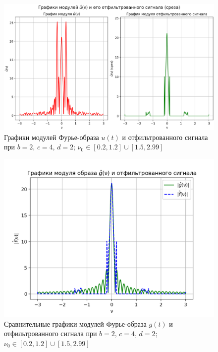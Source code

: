 \begin{figure}[ht!]
    \centering
    \includegraphics[scale=0.55]{media/1 task/specific_freq/Fourier_Image_2_4_2_-1,2_-0,2_-2,99_-2,7_-2,7_-1,5.png}
    \caption{Графики модулей Фурье-образа $u(t)$ и отфильтрованного сигнала при $b=2$, $c=4$, $d=2$; $\nu_0 \in [0.2, 1.2] \cup [1.5, 2.99]$}
    \label{fig:four_2_4_2_5}
\end{figure}

\begin{figure}[ht!]
    \centering
    \includegraphics[scale=0.55]{media/1 task/specific_freq/Fourier_Image_Comparison_2_4_2_-1,2_-0,2_-2,99_-2,7_-2,7_-1,5.png}
    \caption{Сравнительные графики модулей Фурье-образа $g(t)$ и отфильтрованного сигнала при $b=2$, $c=4$, $d=2$; $\nu_0 \in [0.2, 1.2] \cup [1.5, 2.99]$}
    \label{fig:fourc_2_4_2_5}
\end{figure}

